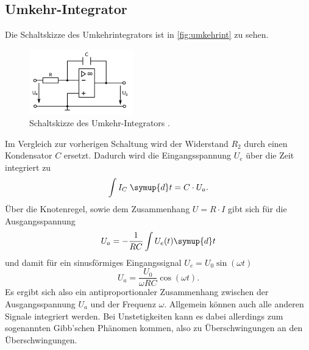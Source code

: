\subsection{Umkehr-Integrator}
Die Schaltskizze des Umkehrintegrators ist in \autoref{fig:umkehrint} zu sehen.
\begin{figure}[H]
    \centering
    \includegraphics[width=0.4\textwidth]{integrator.png}
    \caption{Schaltskizze des Umkehr-Integrators \cite{anleitung}.}
    \label{fig:umkehrint}
\end{figure}
Im Vergleich zur vorherigen Schaltung wird der Widerstand $R_2$ durch einen Kondensator $C$
ersetzt.
Dadurch wird die Eingangsspannung $U_e$ über die Zeit integriert zu
\begin{equation*}
    \int I_C \; \symup{d} t = C \cdot U_a.
\end{equation*}
Über die Knotenregel, sowie dem Zusammenhang $U = R \cdot I$ gibt sich für die Ausgangsspannung
\begin{equation*}
    U_a = - \frac{1}{RC} \int U_e (t) \symup{d} t
\end{equation*}
und damit für ein sinusförmiges Eingangssignal $U_e = U_0 \sin(\omega t)$
\begin{equation*}
    U_a = \frac{U_0}{\omega R C} \cos(\omega t).
\end{equation*}
Es ergibt sich also ein antiproportionaler Zusammenhang zwischen der Ausgangsspannung $U_a$
und der Frequenz $\omega$. Allgemein können auch alle anderen Signale integriert werden.
Bei Unstetigkeiten kann es dabei allerdings zum sogenannten Gibb'schen Phänomen kommen,
also zu Überschwingungen an den Überschwingungen. 

